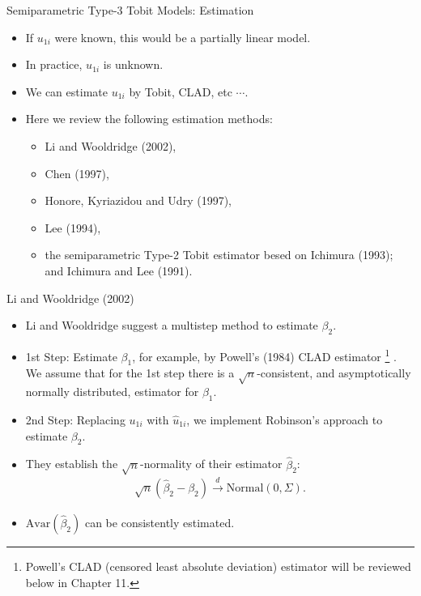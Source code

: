 \documentclass[xcolor=svgnames,dvipdfmx,cjk]{beamer}
\theoremstyle{example}
\def\darrow{\xrightarrow{d}}
\begin{document}
\begin{frame}{Semiparametric Type-3 Tobit Models: Estimation}
      \begin{itemize}
            \item If $u_{1i}$ were known, this would be a partially linear model.
            \item In practice, $u_{1i}$ is unknown.
            \item We can estimate $u_{1i}$ by Tobit, CLAD, etc $\cdots$.
            \item Here we review the following estimation methods:
            \begin{itemize}
                  \item Li and Wooldridge (2002),
                  \item Chen (1997),
                  \item Honore, Kyriazidou and Udry (1997),
                  \item Lee (1994),
                  \item the semiparametric Type-2 Tobit estimator besed on Ichimura (1993); and Ichimura and Lee (1991).
            \end{itemize}
      \end{itemize}
\end{frame}

\begin{frame}{Li and Wooldridge (2002)}
      \begin{itemize}
            \item Li and Wooldridge suggest a multistep method to estimate $\beta_2$.
            \item \alert{1st Step}: Estimate $\beta_1$, for example, by Powell's (1984) CLAD estimator
                  \footnote{Powell's CLAD (censored least absolute deviation) estimator will be reviewed below in Chapter 11.}
                  .
                  We assume that for the 1st step 
                  there is a $\sqrt{n}$-consistent, and asymptotically normally distributed, estimator for $\beta_1$.
            \item \alert{2nd Step}: Replacing $u_{1i}$ with $\hat{u}_{1i}$,
                  we implement Robinson's approach to estimate $\beta_2$.
            \item They establish the $\sqrt{n}$-normality of their estimator $\hat{\beta}_2$:
                  \begin{align*}
                        \sqrt{n}(\hat{\beta}_2 - \beta_2) \darrow \text{Normal} (0, \Sigma).
                  \end{align*}
            \item $\text{Avar} (\hat{\beta}_2)$ can be consistently estimated.
      \end{itemize}
\end{frame}
\end{document}
